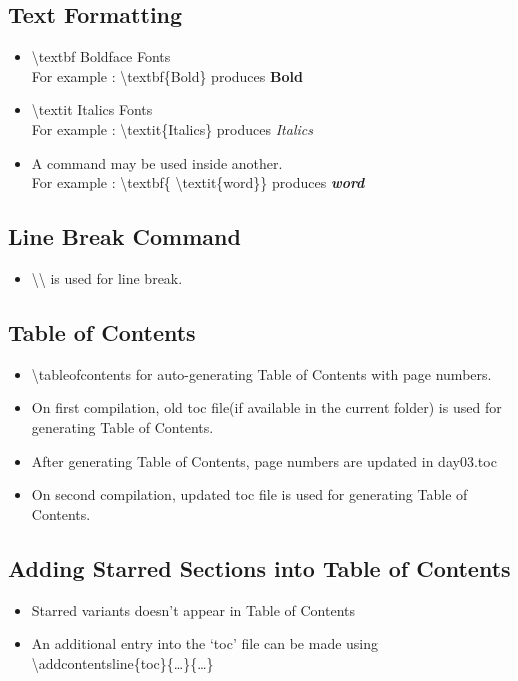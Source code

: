 \documentclass{article}
\begin{document}
\subsection{Text Formatting}
\begin{itemize}
	\item \textbackslash{}textbf Boldface Fonts\\ For example : \textbackslash{}textbf\{Bold\} produces \textbf{Bold}
	\item \textbackslash{}textit Italics Fonts\\ For example : \textbackslash{}textit\{Italics\} produces \textit{Italics}
	\item A command may be used inside another. \\  For example : \textbackslash{}textbf\{ \textbackslash{}textit\{word\}\} produces \textbf{\textit{word}}
\end{itemize}

\subsection{Line Break Command}
\begin{itemize}
	\item \textbackslash{}\textbackslash{} is used for line break.
\end{itemize}

\subsection{Table of Contents}
\begin{itemize}
	\item \textbackslash{}tableofcontents for auto-generating Table of Contents with page numbers.
	\item On first compilation, old toc file(if available in the current folder) is used for generating Table of Contents.
	\item After generating Table of Contents, page numbers are updated in day03.toc
	\item On second compilation, updated toc file is used for generating Table of Contents.
\end{itemize}

\subsection{Adding Starred Sections into Table of Contents}
\begin{itemize}
	\item Starred variants doesn't appear in Table of Contents
	\item An additional entry into the `toc' file can be made using \textbackslash{}addcontentsline\{toc\}\{\dots\}\{\dots\}
\end{itemize}
\end{document}
